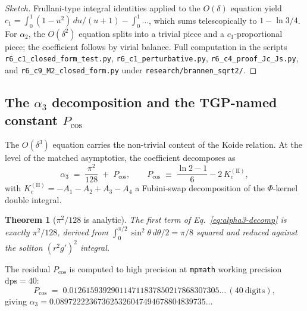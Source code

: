 \documentclass[11pt,a4paper]{article}
\renewcommand{\Phi}{\varPhi}
\newcommand{\Pcos}{P_{\cos}}
\newtheorem{theorem}{Theorem}
\begin{document}
\begin{proof}[Sketch]
Frullani-type integral identities applied to the $O(\delta)$ equation
yield $c_{1}=\int_{0}^{1}(1-u^{2})\,du/(u+1)-\int_{0}^{1}\ldots$,
which sums telescopically to $1-\ln 3/4$. For $\alpha_{2}$, the
$O(\delta^{2})$ equation splits into a trivial piece and a
$c_{1}$-proportional piece; the coefficient follows by virial balance.
Full computation in the scripts
\verb|r6_c1_closed_form_test.py|, \verb|r6_c1_perturbative.py|,
\verb|r6_c4_proof_Jc_Js.py|, and \verb|r6_c9_M2_closed_form.py|
under \verb|research/brannen_sqrt2/|.
\end{proof}

\subsection{The \texorpdfstring{$\alpha_{3}$}{alpha3} decomposition and the TGP-named constant \texorpdfstring{$\Pcos$}{Pcos}}

The $O(\delta^{3})$ equation carries the non-trivial content of the
Koide relation. At the level of the matched asymptotics, the coefficient
decomposes as
\begin{equation}\label{eq:alpha3-decomp}
  \boxed{\;
    \alpha_{3} \;=\; \frac{\pi^{2}}{128} \;+\; \Pcos,
    \qquad
    \Pcos \;\equiv\; \frac{\ln 2 - 1}{6} - 2\,K_{c}^{(\mathrm{II})},
  \;}
\end{equation}
with $K_{c}^{(\mathrm{II})}=-A_{1}-A_{2}+A_{3}-A_{4}$ a Fubini-swap
decomposition of the $\Phi$-kernel double integral.

\begin{theorem}[$\pi^{2}/128$ is analytic]\label{thm:pi2-128}
The first term of Eq.~\eqref{eq:alpha3-decomp} is exactly
$\pi^{2}/128$, derived from $\int_{0}^{\pi/2}\sin^{2}\theta\,d\theta/2=\pi/8$
squared and reduced against the soliton $(r^{2}g')^{2}$ integral.
\end{theorem}

The residual $\Pcos$ is computed to high precision at
\texttt{mpmath} working precision $\mathrm{dps}\!=\!40$:
\begin{equation}\label{eq:Pcos-value}
  \Pcos \;=\; 0.012615939290114711837850217868307305\ldots\,(40~\text{digits}),
\end{equation}
giving $\alpha_{3} = 0.089722223673625326047494678804839735\ldots$
\end{document}
